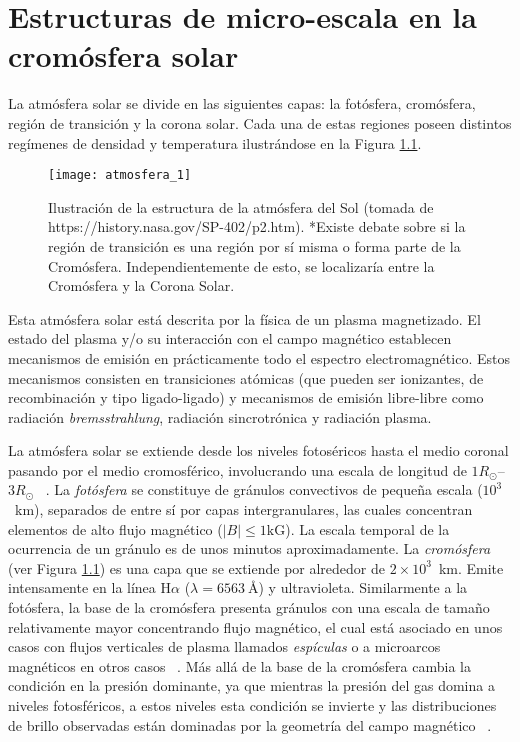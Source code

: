 \chapter{Estructuras de micro-escala en la crom\'osfera solar}

La atm\'osfera solar se divide en las siguientes capas: la fot\'osfera, crom\'osfera, regi\'on de transici\'on y la corona solar. Cada una de estas regiones poseen distintos reg\'imenes de densidad y temperatura ilustr\'andose en la Figura \ref{atmosfera_solar}.

\begin{figure}[h]
\centering
\texttt{[image: atmosfera\_1]}
\caption{Ilustraci\'on de la estructura de la atm\'osfera del Sol (tomada de https://history.nasa.gov/SP-402/p2.htm). \newline
*Existe debate sobre si la regi\'on de transici\'on es una regi\'on por s\'i misma o forma parte de la Crom\'osfera. Independientemente de esto, se localizar\'ia entre la Crom\'osfera y la Corona Solar.} \label{atmosfera_solar}
\end{figure}

Esta atm\'osfera solar est\'a descrita por la f\'isica de un plasma magnetizado. El estado del plasma y/o su interacci\'on con el campo magn\'etico establecen mecanismos de emisi\'on en pr\'acticamente todo el espectro electromagn\'etico. Estos mecanismos consisten en transiciones at\'omicas (que pueden ser ionizantes, de recombinaci\'on y tipo ligado-ligado) y mecanismos de emisi\'on libre-libre como radiaci\'on \emph{bremsstrahlung}, radiaci\'on sincrotr\'onica y radiaci\'on plasma.  ~\citep{ashwanden}

La atm\'osfera solar se extiende desde los niveles fotos\'ericos hasta el medio coronal pasando por el medio cromosf\'erico, involucrando una escala de longitud de $1R_{\odot}$--$3R_{\odot}$ ~\citep{NASAsun}. La \emph{fot\'osfera} se constituye de gr\'anulos convectivos de peque\~na escala ($10^3$~km), separados de entre s\'i por capas intergranulares, las cuales concentran elementos de alto flujo magn\'etico ($|B| \le 1\mbox{kG}$). La escala temporal de la ocurrencia de un gr\'anulo es de unos minutos aproximadamente. La \emph{crom\'osfera} (ver Figura \ref{atmosfera_solar}) es una capa que se extiende por alrededor de $2\times 10^3$~km. Emite intensamente en la l\'inea H$\alpha$ ($\lambda=6563~\mbox{\AA}$) y ultravioleta. Similarmente a la fot\'osfera, la base de la crom\'osfera presenta gr\'anulos con una escala de tama\~no relativamente mayor concentrando flujo magn\'etico, el cual est\'a asociado en unos casos con flujos verticales de plasma llamados \emph{esp\'iculas} o a microarcos magn\'eticos en otros casos ~\citep{NASAweb}. M\'as all\'a de la base de la crom\'osfera cambia la condici\'on en la presi\'on dominante, ya que mientras la presi\'on del gas domina a niveles fotosf\'ericos, a estos niveles esta condici\'on se invierte y las distribuciones de brillo observadas est\'an dominadas por la geometr\'ia del campo magn\'etico ~\citep{priest}.

